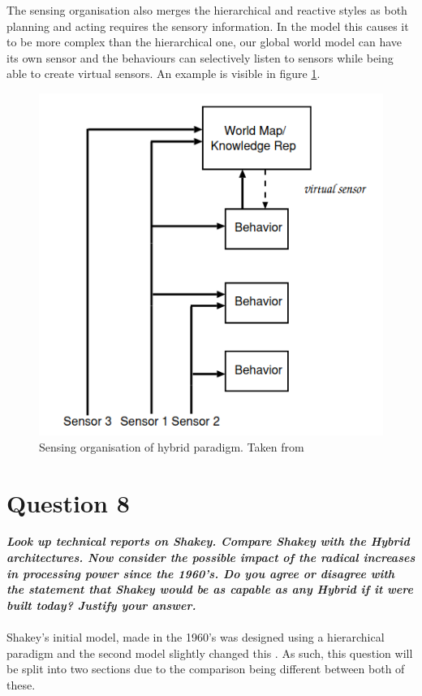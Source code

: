 \documentclass{article}
\newcommand\tab[1][1cm]{\hspace*{#1}}
\begin{document}
\tab The sensing organisation also merges the hierarchical and reactive styles as both planning and
acting requires the sensory
information. In the model this causes it to be more complex than the hierarchical one, our global world model can have its
own sensor and the behaviours can selectively listen to sensors while being able to create virtual sensors.
An example is visible in figure \ref{sOrg}.
\begin{figure}[ht]
    \centering
    \includegraphics[scale=0.5]{img/sensing-organisation.png}
    \caption{Sensing organisation of hybrid paradigm. Taken from \cite{IntroToAI}}
    \label{sOrg}
\end{figure}
\newpage
\section*{Question 8}
\textbf{\textit{
    \tab Look up technical reports on Shakey. Compare Shakey with the Hybrid
architectures.  Now  consider  the  possible  impact  of the  radical  increases  in
 processing power since the 1960’s. Do you agree or disagree with the statement that
Shakey would be as capable as any Hybrid if it were built today? Justify your answer.
}} \\ \\
Shakey's initial model, made in the 1960's was designed using a hierarchical
paradigm and the second model slightly changed this \cite{shakeyHistory}. As
such, this question will be split into two sections due to the comparison being
different between both of these.
\end{document}
